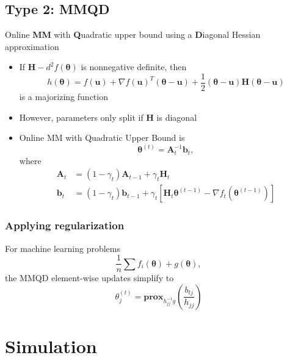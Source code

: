 \documentclass{beamer}
\newcommand{\iter}[2]{#1^{(#2)}}
\begin{document}
\subsection{Type 2: MMQD}
\begin{frame}
  Online \textbf{MM} with \textbf{Q}uadratic upper bound using a \textbf{D}iagonal Hessian approximation
\end{frame}
\begin{frame}
  \begin{itemize}
    \item If $\bm H - d^2 f(\bm\theta)$ is nonnegative definite, then
    $$h(\bm\theta) = f(\bm u) + \nabla f(\bm u)^T(\bm\theta - \bm u) + \frac{1}{2}(\bm\theta - \bm u)\bm H(\bm\theta - \bm u)$$
    is a majorizing function
    \item However, parameters only split if $\bm H$ is diagonal
  \end{itemize}
\end{frame}
\begin{frame}
  \begin{itemize}
    \item Online MM with Quadratic Upper Bound is
    $$\iter{\bm\theta}{t} = \bm A_t^{-1}\bm b_t,$$
    where
    $$\begin{aligned}
      \bm A_t &= (1 - \gamma_t)\bm A_{t-1} + \gamma_t \bm H_t \\
      \bm b_t &= (1 - \gamma_t)\bm b_{t-1} + \gamma_t[\bm H_t\iter{\bm\theta}{t-1} - \nabla f_t(\iter{\bm\theta}{t-1})]
      \end{aligned}$$
  \end{itemize}
\end{frame}
\begin{frame}
  \frametitle{Applying regularization}
  For machine learning problems
    $$\frac{1}{n}\sum f_i(\bm\theta) + g(\bm\theta),$$
    the MMQD element-wise updates simplify to
    $$\iter{\theta_j}{t} = \mathbf{prox}_{h_{jj}^{-1}g}\left(\frac{b_{tj}}{h_{jj}}\right)$$
\end{frame}

\section{Simulation}
\end{document}
